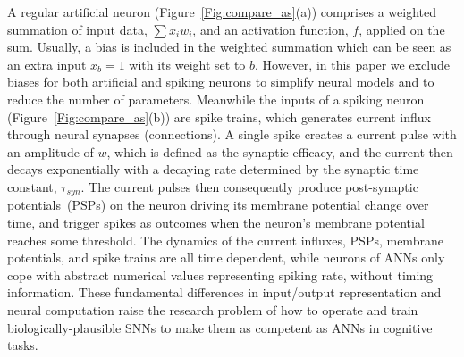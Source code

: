 \documentclass{article}
\begin{document}
	A regular artificial neuron (Figure~\ref{Fig:compare_as}(a)) comprises a weighted summation of input data, $\sum x_i w_i$, and an activation function, $f$, applied on the sum.
	Usually, a bias is included in the weighted summation which can be seen as an extra input $x_b = 1$ with its weight set to $b$.
	However, in this paper we exclude biases for both artificial and spiking neurons to simplify neural models and to reduce the number of parameters.
	Meanwhile the inputs of a spiking neuron (Figure~\ref{Fig:compare_as}(b)) are spike trains, which generates current influx through neural synapses (connections).
	A single spike creates a current pulse with an amplitude of $w$, which is defined as the synaptic efficacy, and the current then decays exponentially with a decaying rate determined by the synaptic time constant, $\tau_{syn}$.
	The current pulses then consequently produce post-synaptic potentials~(PSPs) on the neuron driving its membrane potential change over time, and trigger spikes as outcomes when the neuron's membrane potential reaches some threshold.
	The dynamics of the current influxes, PSPs, membrane potentials, and spike trains are all time dependent, while neurons of ANNs only cope with abstract numerical values representing spiking rate, without timing information.
	These fundamental differences in input/output representation and neural computation raise the research problem of how to operate and train biologically-plausible SNNs to make them as competent as ANNs in cognitive tasks.
	
\end{document}
